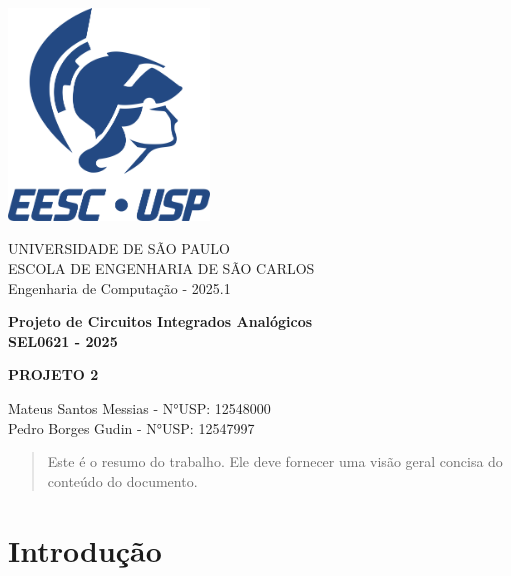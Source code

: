 \documentclass[12pt,a4paper]{article}
\newcommand{\imprimirMateria}{Projeto de Circuitos Integrados Analógicos}
\newcommand{\imprimirCodMateria}{SEL0621}
\newcommand{\imprimirTitulo}{Projeto 2}
\newcommand{\imprimirSubtitulo}{Engenharia de Computação}
\newcommand{\imprimirAutores}{Mateus Santos Messias - N°USP: 12548000 \\ Pedro Borges Gudin - N°USP: 12547997}
\newcommand{\imprimirAno}{2025}
\begin{document}
\begin{titlepage}
    \begin{center}
        \vspace*{0.5cm}
        \includegraphics[width=0.4\textwidth]{images/Logo EESC-USP - Vertical Monocromatico Azul (ECM).png}
            
        \Large
        \vspace{1cm}
        UNIVERSIDADE DE SÃO PAULO\\
        ESCOLA DE ENGENHARIA DE SÃO CARLOS\\
        \imprimirSubtitulo{} - \imprimirAno.1
        

        \vspace{2cm}
        \LARGE
        \textbf{
            \imprimirMateria{}\\
            \imprimirCodMateria{} - \imprimirAno
        }
        
        \vspace{3.5cm}
        \Huge
        \uppercase{\textbf{\imprimirTitulo}}
        
        \vfill
        
        \large
        \imprimirAutores
        
        \vspace{2cm}
        
    \end{center}
\end{titlepage}

\newpage

\begin{abstract}
Este é o resumo do trabalho. Ele deve fornecer uma visão geral concisa do conteúdo do documento.
\end{abstract}

\newpage
\tableofcontents
\newpage

\section*{Introdução}
\end{document}
